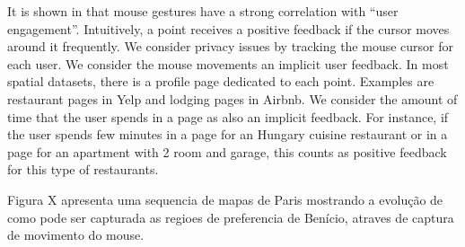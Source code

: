 \documentclass[runningheads,a4paper]{llncs}
\begin{document}
It is shown in \cite{arapakis2014understanding} that mouse gestures have a strong correlation with ``user engagement''. Intuitively, a point receives a positive feedback if the cursor moves around it frequently. We consider privacy issues by tracking the mouse cursor for each user. We consider the mouse movements an implicit user feedback. In most spatial datasets, there is a profile page dedicated to each point. Examples are restaurant pages in Yelp and lodging pages in Airbnb. We consider the amount of time that the user spends in a page as also an implicit feedback. For instance, if the user spends few minutes in a page for an Hungary cuisine restaurant or in a page for an apartment with 2 room and garage, this counts as positive feedback for this type of restaurants.

Figura X apresenta uma sequencia de mapas de Paris mostrando a evolução de como pode ser capturada as regioes de preferencia de Benício, atraves de captura de movimento do mouse. 
\end{document}
